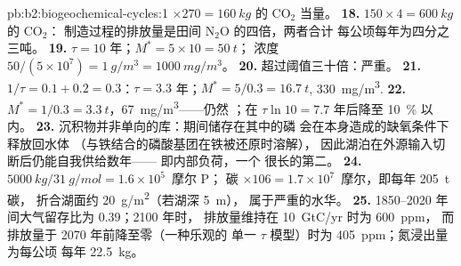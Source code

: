 \begin{solution}{pb:b2:biogeochemical-cycles:1}
$\times 270 = \qty{160}{kg}$ 的 $\mathrm{CO_2}$ 当量。
\textbf{18.} $150\times 4 = \qty{600}{kg}$ 的 $\mathrm{CO_2}$：
制造过程的排放量是田间 $\mathrm{N_2O}$ 的四倍，两者合计
每公顷每年为四分之三吨。
\textbf{19.} $\tau = 10$ 年；$M^{*} = 5\times 10 = \qty{50}{t}$；
浓度 $50/(5\times 10^{7}) = \qty{1}{g/m^3} =
\qty{1000}{mg/m^3}$。
\textbf{20.} 超过阈值三十倍：严重。
\textbf{21.} $1/\tau = 0.1 + 0.2 = 0.3$：$\tau = 3.3$ 年；$M^{*} =
5/0.3 = \qty{16.7}{t}$, \qty{330}{mg/m^3}.
\textbf{22.} $M^{*} = 1/0.3 = \qty{3.3}{t}$，\qty{67}{mg/m^3}——仍然
；在 $\tau\ln 10 = 7.7$ 年后降至 \qty{10}{\%} 以内。
\textbf{23.} 沉积物并非单向的库：期间储存在其中的磷
会在本身造成的缺氧条件下释放回水体
（与铁结合的磷酸基团在铁被还原时溶解），
因此湖泊在外源输入切断后仍能自我供给数年——
即内部负荷，一个
很长的第二。
\textbf{24.} $\qty{5000}{kg}/\qty{31}{g/mol} = 1.6\times 10^{5}$~摩尔 P；
碳 $\times 106 = 1.7\times 10^{7}$~摩尔，即每年 \qty{205}{t} 碳，
折合湖面约 \qty{20}{g/m^2}（若湖深 \qty{5}{m}），
属于严重的水华。
\textbf{25.} 1850--2020 年间大气留存比为 $0.39$；2100 年时，
排放量维持在 \qty{10}{GtC/yr} 时为 \qty{600}{ppm}，
而排放量于 2070 年前降至零（一种乐观的
单一 $\tau$ 模型）时为 \qty{405}{ppm}；氮浸出量为每公顷
每年 \qty{22.5}{kg}。
\end{solution}
